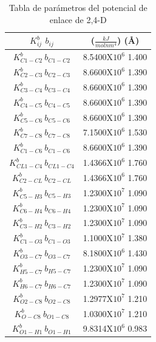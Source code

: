 \begin{table}[!h]
    \centering
    \begin{tabular}{|c|c|}
    \hline
    $K^b_{ij}$ $b_{ij}$   & ($\frac{kJ}{molnm^4}$) (\AA)\\
    \hline
    $K^b_{C1-C2}\ b_{C1-C2}$   & 8.5400X$10^6$ 1.400\\
    $K^b_{C2-C3}\ b_{C2-C3}$   & 8.6600X$10^6$ 1.390\\
    $K^b_{C3-C4}\ b_{C3-C4}$   & 8.6600X$10^6$ 1.390\\
    $K^b_{C4-C5}\ b_{C4-C5}$   & 8.6600X$10^6$ 1.390\\
    $K^b_{C5-C6}\ b_{C5-C6}$   & 8.6600X$10^6$ 1.390\\
    $K^b_{C7-C8}\ b_{C7-C8}$   & 7.1500X$10^6$ 1.530\\
    $K^b_{C1-C6}\ b_{C1-C6}$   & 8.6600X$10^6$ 1.390\\
    $K^b_{CL1-C4}\ b_{CL1-C4}$ & 1.4366X$10^6$ 1.760\\
    $K^b_{C2-CL}\ b_{C2-CL}$   & 1.4366X$10^6$ 1.760\\
    $K^b_{C5-H3}\ b_{C5-H3}$   & 1.2300X$10^7$ 1.090\\
    $K^b_{C6-H4}\ b_{C6-H4}$   & 1.2300X$10^7$ 1.090\\
    $K^b_{C3-H2}\ b_{C3-H2}$   & 1.2300X$10^7$ 1.090\\
    $K^b_{C1-O3}\ b_{C1-O3}$   & 1.1000X$10^7$ 1.380\\
    $K^b_{O3-C7}\ b_{O3-C7}$   & 8.1800X$10^6$ 1.430\\
    $K^b_{H5-C7}\ b_{H5-C7}$   & 1.2300X$10^7$ 1.090\\
    $K^b_{H6-C7}\ b_{H6-C7}$   & 1.2300X$10^7$ 1.090\\
    $K^b_{O2-C8}\ b_{O2-C8}$   & 1.2977X$10^7$ 1.210\\
    $K^b_{O-C8} \ b_{O1-C8}$   & 1.0300X$10^7$ 1.210\\
    $K^b_{O1-H1}\ b_{O1-H1}$   & 9.8314X$10^6$ 0.983\\
    \hline
    \end{tabular}
    \caption{Tabla de parámetros del potencial de enlace de 2,4-D}
    \label{tab:enlace24D}
\end{table}



